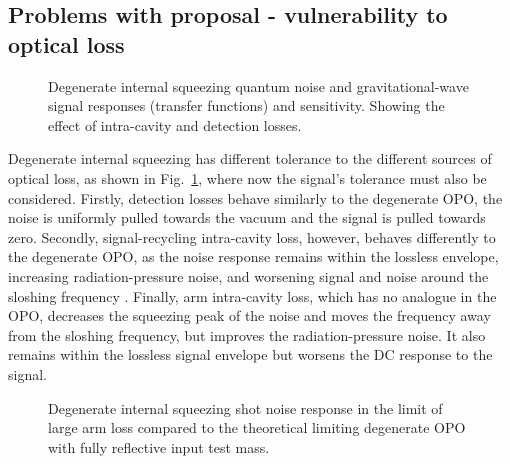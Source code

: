 \subsection{Problems with proposal - vulnerability to optical loss}

\begin{figure}
	\centering
	\caption{Degenerate internal squeezing quantum noise and gravitational-wave signal responses (transfer functions) and sensitivity. Showing the effect of intra-cavity and detection losses. }
	\label{fig:dIS_loss_tolerance}
\end{figure}

Degenerate internal squeezing has different tolerance to the different sources of optical loss, as shown in Fig.~\ref{fig:dIS_loss_tolerance}, where now the signal's tolerance must also be considered. Firstly, detection losses behave similarly to the degenerate OPO, the noise is uniformly pulled towards the vacuum and the signal is pulled towards zero. Secondly, signal-recycling intra-cavity loss, however, behaves differently to the degenerate OPO, as the noise response remains within the lossless envelope, increasing radiation-pressure noise, and worsening signal and noise around the sloshing frequency . Finally, arm intra-cavity loss, which has no analogue in the OPO, decreases the squeezing peak of the noise and moves the frequency away from the sloshing frequency, but improves the radiation-pressure noise. It also remains within the lossless signal envelope but worsens the DC response to the signal.

\begin{figure}
	\centering
	\caption{Degenerate internal squeezing shot noise response in the limit of large arm loss compared to the theoretical limiting degenerate OPO with fully reflective input test mass.}
	\label{fig:}
\end{figure}

